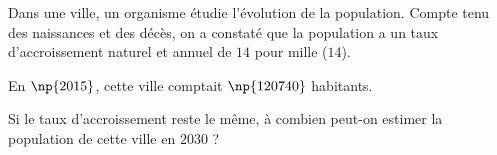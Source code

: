 \begin{exo}{}
	Dans une ville, un organisme étudie l'évolution de la population. Compte tenu des naissances et des décès, on a constaté que la population a un taux d'accroissement naturel et annuel de $14$ pour mille ($14$\textperthousand).

	En $\np{2015}$, cette ville comptait $\np{120740}$ habitants.

	Si le taux d'accroissement reste le même, à combien peut-on estimer la population de cette ville en $2030$ ?
\end{exo}
